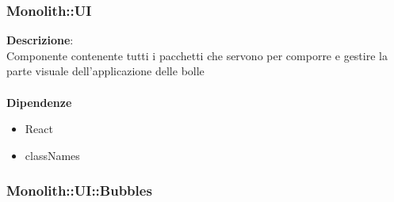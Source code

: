 \clearpage

\subsubsection{Monolith::UI}
\textbf{Descrizione}:\\
 Componente contenente tutti i pacchetti che servono per comporre e gestire la parte visuale dell'applicazione delle bolle \\\\
\textbf{Dipendenze}
\begin{itemize}
\item React
\item classNames
\end{itemize} 


\clearpage

\subsubsection{Monolith::UI::Bubbles}
   \FloatBarrier
